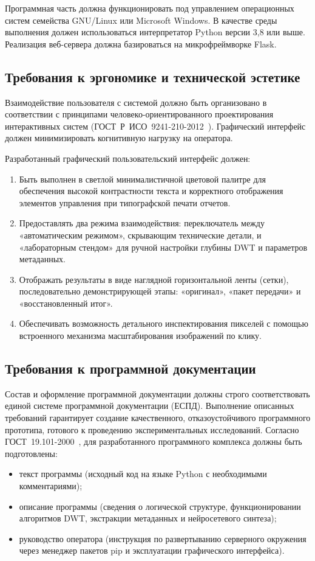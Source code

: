 Программная часть должна функционировать под управлением операционных систем семейства GNU/Linux или Microsoft Windows. В качестве среды выполнения должен использоваться интерпретатор Python версии 3,8 или выше. Реализация веб-сервера должна базироваться на микрофреймворке Flask.

\subsection{Требования к эргономике и технической эстетике}

Взаимодействие пользователя с системой должно быть организовано в соответствии с принципами человеко-ориентированного проектирования интерактивных систем (ГОСТ~Р~ИСО~9241-210-2012~\cite{gost_iso_9241_210}). Графический интерфейс должен минимизировать когнитивную нагрузку на оператора.

Разработанный графический пользовательский интерфейс должен:
\begin{enumerate}
    \item Быть выполнен в светлой минималистичной цветовой палитре для обеспечения высокой контрастности текста и корректного отображения элементов управления при типографской печати отчетов.
    \item Предоставлять два режима взаимодействия: переключатель между «автоматическим режимом», скрывающим технические детали, и «лабораторным стендом» для ручной настройки глубины DWT и параметров метаданных.
    \item Отображать результаты в виде наглядной горизонтальной ленты (сетки), последовательно демонстрирующей этапы: «оригинал», «пакет передачи» и «восстановленный итог».
    \item Обеспечивать возможность детального инспектирования пикселей с помощью встроенного механизма масштабирования изображений по клику.
\end{enumerate}

\subsection{Требования к программной документации}

Состав и оформление программной документации должны строго соответствовать единой системе программной документации (ЕСПД). Выполнение описанных требований гарантирует создание качественного, отказоустойчивого программного прототипа, готового к проведению экспериментальных исследований. Согласно ГОСТ~19.101-2000~\cite{gost_19_101_2000}, для разработанного программного комплекса должны быть подготовлены:
\begin{itemize}
    \item текст программы (исходный код на языке Python с необходимыми комментариями);
    \item описание программы (сведения о логической структуре, функционировании алгоритмов DWT, экстракции метаданных и нейросетевого синтеза);
    \item руководство оператора (инструкция по развертыванию серверного окружения через менеджер пакетов pip и эксплуатации графического интерфейса).
\end{itemize}